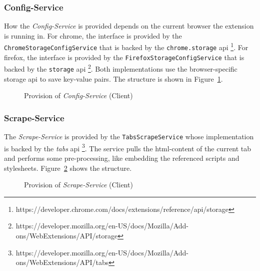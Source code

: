 \subsubsection{Config-Service}
How the \textit{Config-Service} is provided depends on the current browser the extension is running in.
For chrome, the interface is provided by the \texttt{ChromeStorageConfigService} that is backed by the \texttt{chrome.storage} api \footnote{https://developer.chrome.com/docs/extensions/reference/api/storage}.
For firefox, the interface is provided by the \texttt{FirefoxStorageConfigService} that is backed by the \texttt{storage} api \footnote{https://developer.mozilla.org/en-US/docs/Mozilla/Add-ons/WebExtensions/API/storage}. \newline
Both implementations use the browser-specific storage api to save key-value pairs.
The structure is shown in Figure~\ref{fig:active-config-service-p}.

\begin{figure}
    \centering
    \caption{Provision of \textit{Config-Service} (Client)}
    \label{fig:active-config-service-p}
\end{figure}

\subsubsection{Scrape-Service}
The \textit{Scrape-Service} is provided by the \texttt{TabsScrapeService} whose implementation is backed by the \textit{tabs} api \footnote{https://developer.mozilla.org/en-US/docs/Mozilla/Add-ons/WebExtensions/API/tabs}.
The service pulls the html-content of the current tab and performs some pre-processing, like embedding the referenced scripts and stylesheets.
Figure~\ref{fig:active-scrape-service-p} shows the structure.

\begin{figure}
    \centering
    \caption{Provision of \textit{Scrape-Service} (Client)}
    \label{fig:active-scrape-service-p}
\end{figure}